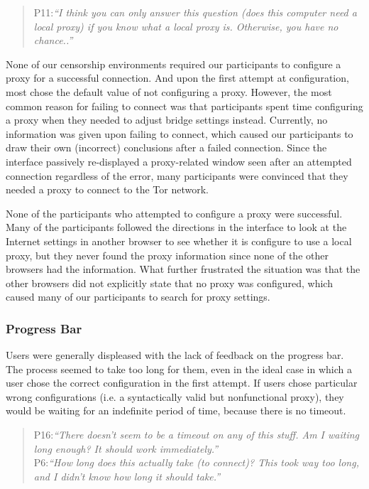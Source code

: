 \documentclass[USenglish,oneside,twocolumn]{article}
\begin{document}
\begin{quotation}
\noindent P11:\textit{``I think you can only answer this question (does this computer need a local proxy) if you know what a local proxy is. Otherwise, you have no chance..''}
\end{quotation}

None of our censorship environments required our participants to configure a proxy for a successful connection. And upon the first attempt at configuration, most chose the default value of not configuring a proxy.  However, the most common reason for failing to connect was that participants spent time configuring a proxy when they needed to adjust  bridge settings instead. Currently, no information was given upon failing to connect, which caused our participants to draw their own (incorrect) conclusions after a failed connection. Since the interface passively re-displayed a proxy-related window seen after an attempted connection regardless of the error, many participants were convinced that they needed a proxy to connect to the Tor network.

None of the participants who attempted to configure a proxy were successful. Many of the participants followed the directions in the interface to look at the Internet settings in another browser to see whether it is configure to use a local proxy, but they never found the proxy information since none of the other browsers had the information. What further frustrated the situation was that the other browsers did not explicitly state that no proxy was configured, which caused many of our participants to search for proxy settings.\\

\subsubsection{Progress Bar} 
Users were generally displeased with the lack of feedback on the progress bar. The process seemed to take too long for them, even in the ideal case in which a user chose the correct configuration in the first attempt. If users chose particular wrong configurations (i.e. a syntactically valid but nonfunctional proxy), they would be waiting for an indefinite period of time, because there is no timeout. 

\begin{quotation}
\noindent P16:\textit{``There doesn't seem to be a timeout on any of this stuff. Am I waiting long enough? It should work immediately.''}\\

\noindent P6:\textit{``How long does this actually take (to connect)? This took way too long, and I didn't know how long it should take.''}
\end{quotation}
\end{document}
